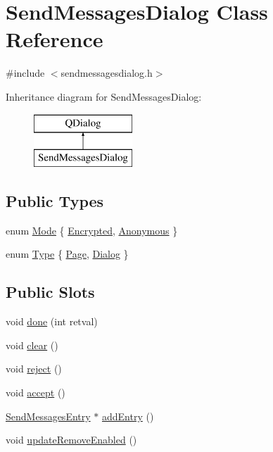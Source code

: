 \hypertarget{class_send_messages_dialog}{}\section{Send\+Messages\+Dialog Class Reference}
\label{class_send_messages_dialog}


{\ttfamily \#include $<$sendmessagesdialog.\+h$>$}

Inheritance diagram for Send\+Messages\+Dialog\+:\begin{figure}[H]
\begin{center}
\leavevmode
\includegraphics[height=2.000000cm]{class_send_messages_dialog}
\end{center}
\end{figure}
\subsection*{Public Types}
\begin{DoxyCompactItemize}
\item 
enum \hyperlink{class_send_messages_dialog_aa123d2b61a8bd27c054469a331d69c43}{Mode} \{ \hyperlink{class_send_messages_dialog_aa123d2b61a8bd27c054469a331d69c43a083da80ff3b2e7b71b2c26a8b4a8982e}{Encrypted}, 
\hyperlink{class_send_messages_dialog_aa123d2b61a8bd27c054469a331d69c43a9694f2bb3a95d29f2c20c27effcb292c}{Anonymous}
 \}
\item 
enum \hyperlink{class_send_messages_dialog_ae5855bcf6efac64a72d85546f1cabc35}{Type} \{ \hyperlink{class_send_messages_dialog_ae5855bcf6efac64a72d85546f1cabc35a6589a50ad77af9037b71f641e044e5da}{Page}, 
\hyperlink{class_send_messages_dialog_ae5855bcf6efac64a72d85546f1cabc35a5f0ef29c027d54a2e0309ad07e01efcd}{Dialog}
 \}
\end{DoxyCompactItemize}
\subsection*{Public Slots}
\begin{DoxyCompactItemize}
\item 
void \hyperlink{class_send_messages_dialog_a39929b11f0516f1360a36dcfaa9ae38e}{done} (int retval)
\item 
void \hyperlink{class_send_messages_dialog_abd621460aeabc209648050bab5bf16f9}{clear} ()
\item 
void \hyperlink{class_send_messages_dialog_a9a676cf7ce3b8d0c0996366d651cf77d}{reject} ()
\item 
void \hyperlink{class_send_messages_dialog_a0fbe14e62f3ef38beec76dae64f0fd25}{accept} ()
\item 
\hyperlink{class_send_messages_entry}{Send\+Messages\+Entry} $\ast$ \hyperlink{class_send_messages_dialog_a82e310529e39f9e62a25f0df233c6be7}{add\+Entry} ()
\item 
void \hyperlink{class_send_messages_dialog_a33a21b7d103330c784e6dc5590d7a2c4}{update\+Remove\+Enabled} ()
\end{DoxyCompactItemize}
